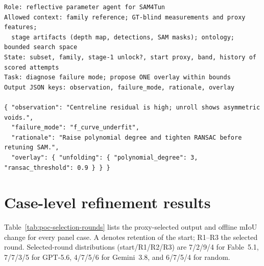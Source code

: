 \documentclass[a4paper,fleqn]{cas-dc}
\begin{document}
\begin{lstlisting}[caption={Prompt skeleton (per attempt) and one example response.},label={lst:prompt-skeleton}]
Role: reflective parameter agent for SAM4Tun
Allowed context: family reference; GT-blind measurements and proxy features;
  stage artifacts (depth map, detections, SAM masks); ontology; bounded search space
State: subset, family, stage-1 unlock?, start proxy, band, history of scored attempts
Task: diagnose failure mode; propose ONE overlay within bounds
Output JSON keys: observation, failure_mode, rationale, overlay

{ "observation": "Centreline residual is high; unroll shows asymmetric voids.",
  "failure_mode": "f_curve_underfit",
  "rationale": "Raise polynomial degree and tighten RANSAC before retuning SAM.",
  "overlay": { "unfolding": { "polynomial_degree": 3, "ransac_threshold": 0.9 } } }
\end{lstlisting}

\section{Case-level refinement results}\label{app:poc-selection}

Table~\ref{tab:poc-selection-rounds} lists the proxy-selected output and offline mIoU change for every panel case. A denotes retention of the start; R1--R3 the selected round. Selected-round distributions (start/R1/R2/R3) are 7/2/9/4 for Fable~5.1, 7/7/3/5 for GPT-5.6, 4/7/5/6 for Gemini~3.8, and 6/7/5/4 for random.
\end{document}
